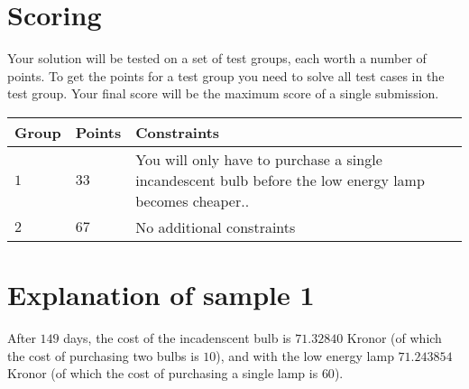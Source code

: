 \section*{Scoring}
Your solution will be tested on a set of test groups, each worth a number of points.
To get the points for a test group you need to solve all test cases in the test group. Your final score will be the maximum score of a single submission.

\noindent
\begin{tabular}{| l | l | l |}
  \hline
  Group & Points & Constraints \\ \hline
  $1$    & $33$        &  You will only have to purchase a single incandescent bulb before the low energy lamp becomes cheaper.. \\ \hline
  $2$    & $67$        &  No additional constraints \\ \hline
\end{tabular}

\section*{Explanation of sample 1}
After $149$ days, the cost of the incadenscent bulb is $71.32840$ Kronor (of which the cost of purchasing two bulbs is $10$), and with the low energy lamp $71.243854$ Kronor (of which the cost of purchasing a single lamp is $60$).
